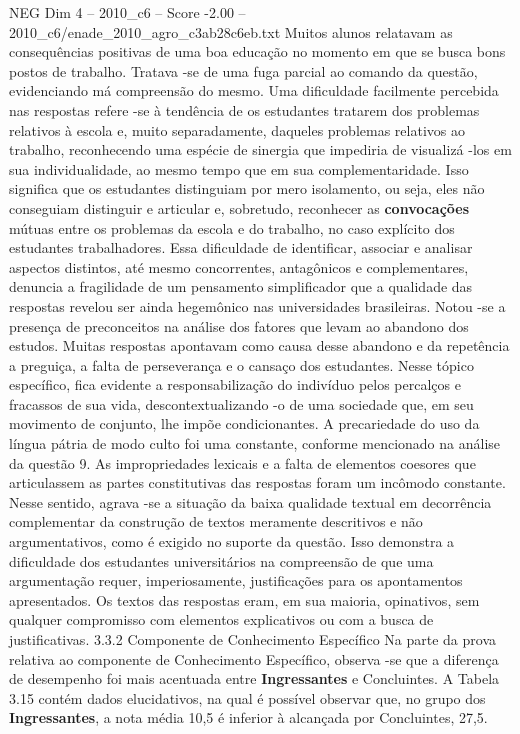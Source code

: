 \begin{textsample}{NEG Dim 4 – 2010\_c6 – Score -2.00 – 2010\_c6/enade\_2010\_agro\_c3ab28c6eb.txt}
Muitos alunos relatavam as consequências positivas de uma boa educação no momento em que se busca bons postos de trabalho.
Tratava -se de uma fuga parcial ao comando da questão, evidenciando má compreensão do mesmo.
Uma dificuldade facilmente percebida nas respostas refere -se à tendência de os estudantes tratarem dos problemas relativos à escola e, muito separadamente, daqueles problemas relativos ao trabalho, reconhecendo uma espécie de sinergia que impediria de visualizá -los em sua individualidade, ao mesmo tempo que em sua complementaridade.
Isso significa que os estudantes distinguiam por mero isolamento, ou seja, eles não conseguiam distinguir e articular e, sobretudo, reconhecer as \textbf{convocações} mútuas entre os problemas da escola e do trabalho, no caso explícito dos estudantes trabalhadores.
Essa dificuldade de identificar, associar e analisar aspectos distintos, até mesmo concorrentes, antagônicos e complementares, denuncia a fragilidade de um pensamento simplificador que a qualidade das respostas revelou ser ainda hegemônico nas universidades brasileiras.
Notou -se a presença de preconceitos na análise dos fatores que levam ao abandono dos estudos.
Muitas respostas apontavam como causa desse abandono e da repetência a preguiça, a falta de perseverança e o cansaço dos estudantes.
Nesse tópico específico, fica evidente a responsabilização do indivíduo pelos percalços e fracassos de sua vida, descontextualizando -o de uma sociedade que, em seu movimento de conjunto, lhe impõe condicionantes.
A precariedade do uso da língua pátria de modo culto foi uma constante, conforme mencionado na análise da questão 9.
As impropriedades lexicais e a falta de elementos coesores que articulassem as partes constitutivas das respostas foram um incômodo constante.
Nesse sentido, agrava -se a situação da baixa qualidade textual em decorrência complementar da construção de textos meramente descritivos e não argumentativos, como é exigido no suporte da questão.
Isso demonstra a dificuldade dos estudantes universitários na compreensão de que uma argumentação requer, imperiosamente, justificações para os apontamentos apresentados.
Os textos das respostas eram, em sua maioria, opinativos, sem qualquer compromisso com elementos explicativos ou com a busca de justificativas. 3.3.2 Componente de Conhecimento Específico Na parte da prova relativa ao componente de Conhecimento Específico, observa -se que a diferença de desempenho foi mais acentuada entre \textbf{Ingressantes} e Concluintes.
A Tabela 3.15 contém dados elucidativos, na qual é possível observar que, no grupo dos \textbf{Ingressantes}, a nota média 10,5 é inferior à alcançada por Concluintes, 27,5.

\end{textsample}
